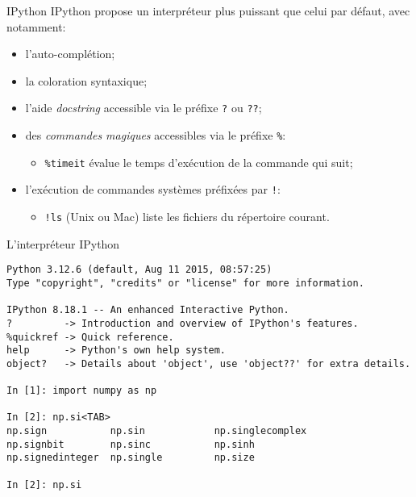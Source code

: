 \documentclass[dvipsnames]{beamer}
\begin{document}
\begin{frame}
    [fragile]{IPython}
    IPython propose un interpréteur plus puissant que celui par défaut, avec
    notamment:
    \begin{itemize}
        \item l'auto-complétion;
        \item la coloration syntaxique;
        \item l'aide \emph{docstring} accessible via le préfixe \verb+?+ ou
              \verb+??+;
        \item des \emph{commandes magiques} accessibles via le préfixe \verb+%+:
              \begin{itemize}
                  \scriptsize
                  \item \texttt{\%timeit} évalue le temps d'exécution de la
                        commande qui suit;
              \end{itemize}
        \item l'exécution de commandes systèmes préfixées par \verb+!+:
              \begin{itemize}
                  \scriptsize
                  \item \texttt{!ls} (Unix ou Mac) liste les fichiers du
                        répertoire courant.
              \end{itemize}
    \end{itemize}
\end{frame}

\begin{frame}
    [fragile]{L'interpréteur IPython}

    \begin{verbatim}
Python 3.12.6 (default, Aug 11 2015, 08:57:25)
Type "copyright", "credits" or "license" for more information.

IPython 8.18.1 -- An enhanced Interactive Python.
?         -> Introduction and overview of IPython's features.
%quickref -> Quick reference.
help      -> Python's own help system.
object?   -> Details about 'object', use 'object??' for extra details.

In [1]: import numpy as np

In [2]: np.si<TAB>
np.sign           np.sin            np.singlecomplex
np.signbit        np.sinc           np.sinh
np.signedinteger  np.single         np.size

In [2]: np.si
\end{verbatim}
\end{frame}
\end{document}
